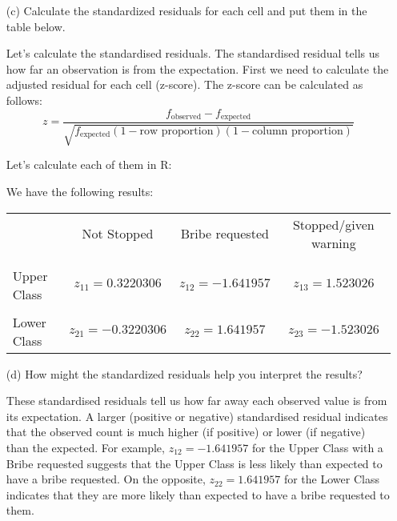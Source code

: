 \documentclass[12pt,letterpaper]{article}
\begin{document}
\begin{enumerate}
	

	\newpage
	\item [(c)] Calculate the standardized residuals for each cell and put them in the table below.
	\vspace{1cm}
	
	Let's calculate the standardised residuals. The standardised residual tells us how far an observation is from the expectation. 
	First we need to calculate the adjusted residual for each cell (z-score).
	The z-score can be calculated as follows:
	\[
	z = \frac{f_{\text{observed}} - f_{\text{expected}}}{\sqrt{f_{\text{expected}}(1 - \text{row proportion})(1 - \text{column proportion})}}
	\]
	
	
	Let's calculate each of them in R:
	
	
We have the following results:
	
	\begin{table}[h]
		\centering
		\begin{tabular}{l | c c c }
			& Not Stopped & Bribe requested & Stopped/given warning \\
			\\[-1.8ex] 
			\hline \\[-1.8ex]
			Upper Class  & \( z_{11}=0.3220306 \) & \( z_{12}=-1.641957 \) & \( z_{13}=1.523026\) \\
			\\
			Lower Class & \( z_{21}=-0.3220306 \) & \( z_{22}=1.641957 \) & \( z_{23} =-1.523026\) \\
			
		\end{tabular}
	\end{table}
	
	
	\vspace{0.5cm}
	\item [(d)] How might the standardized residuals help you interpret the results?  
	\vspace{0.5cm}
	
	
	These standardised residuals tell us how far away each observed value is from its expectation. A larger (positive or negative) standardised residual indicates that the observed count is much higher (if positive) or lower (if negative) than the expected. For example, \( z_{12} = -1.641957 \) for the Upper Class with a Bribe requested suggests that the Upper Class is less likely than expected to have a bribe requested. On the opposite, \( z_{22} = 1.641957 \) for the Lower Class indicates that they are more likely than expected to have a bribe requested to them. \\
	

\end{enumerate}
\end{document}
